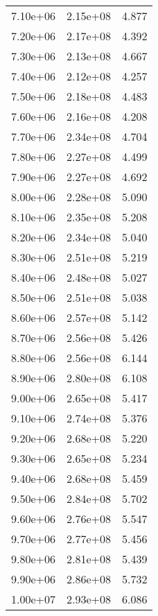 \begin{table}
\begin{tabular}{lll}
7.10e+06 & 2.15e+08 & 4.877 \\
7.20e+06 & 2.17e+08 & 4.392 \\
7.30e+06 & 2.13e+08 & 4.667 \\
7.40e+06 & 2.12e+08 & 4.257 \\
7.50e+06 & 2.18e+08 & 4.483 \\
7.60e+06 & 2.16e+08 & 4.208 \\
7.70e+06 & 2.34e+08 & 4.704 \\
7.80e+06 & 2.27e+08 & 4.499 \\
7.90e+06 & 2.27e+08 & 4.692 \\
8.00e+06 & 2.28e+08 & 5.090 \\
8.10e+06 & 2.35e+08 & 5.208 \\
8.20e+06 & 2.34e+08 & 5.040 \\
8.30e+06 & 2.51e+08 & 5.219 \\
8.40e+06 & 2.48e+08 & 5.027 \\
8.50e+06 & 2.51e+08 & 5.038 \\
8.60e+06 & 2.57e+08 & 5.142 \\
8.70e+06 & 2.56e+08 & 5.426 \\
8.80e+06 & 2.56e+08 & 6.144 \\
8.90e+06 & 2.80e+08 & 6.108 \\
9.00e+06 & 2.65e+08 & 5.417 \\
9.10e+06 & 2.74e+08 & 5.376 \\
9.20e+06 & 2.68e+08 & 5.220 \\
9.30e+06 & 2.65e+08 & 5.234 \\
9.40e+06 & 2.68e+08 & 5.459 \\
9.50e+06 & 2.84e+08 & 5.702 \\
9.60e+06 & 2.76e+08 & 5.547 \\
9.70e+06 & 2.77e+08 & 5.456 \\
9.80e+06 & 2.81e+08 & 5.439 \\
9.90e+06 & 2.86e+08 & 5.732 \\
1.00e+07 & 2.93e+08 & 6.086 \\
\bottomrule
\end{tabular}
\end{table}
